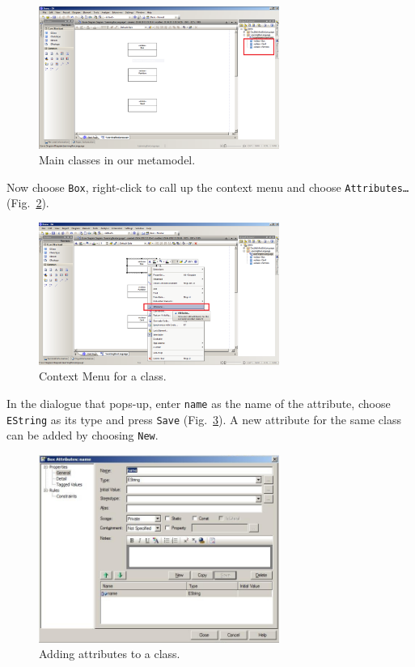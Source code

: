 \begin{figure}[htbp]
	\centering
  \includegraphics[width=0.7\textwidth]{pics/memBoxBilder/memBox10.png}
	\caption{Main classes in our metamodel.}
	\label{fig:all_eclasses}
\end{figure}

Now choose \texttt{Box}, right-click to call up the context menu and choose
\texttt{Att\-ri\-butes\ldots} (Fig.~\ref{fig:attribute}).

\begin{figure}[htbp]
	\centering
  \includegraphics[width=0.7\textwidth]{pics/memBoxBilder/memBox11.png}
	\caption{Context Menu for a class.}
	\label{fig:attribute}
\end{figure}

\clearpage

In the dialogue that pops-up, enter \texttt{name} as the name of the attribute,
choose \texttt{EString} as its type and press \texttt{Save}
(Fig.~\ref{fig:attribute_properties}).  A new attribute for the same class can
be added by choosing \texttt{New}.

\begin{figure}[htbp]
	\centering
  \includegraphics[width=0.7\textwidth]{pics/memBoxBilder/memBox13.png}
	\caption{Adding attributes to a class.}
	\label{fig:attribute_properties}
\end{figure} 

